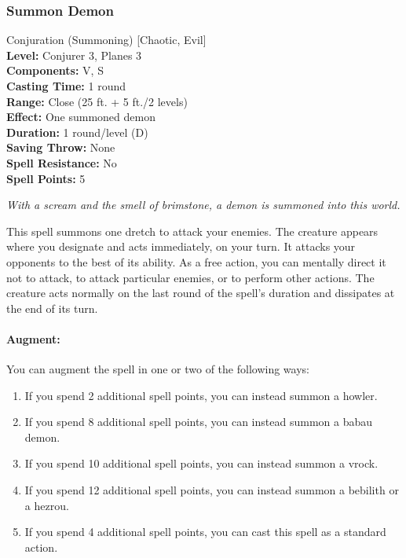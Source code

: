 \subsubsection{Summon Demon}
\label{Spell:SummonDemon}
Conjuration (Summoning) [Chaotic, Evil]
\\ \textbf{Level:} Conjurer 3, Planes 3
\\ \textbf{Components:} V, S
\\ \textbf{Casting Time:} 1 round
\\ \textbf{Range:} Close (25 ft. + 5 ft./2 levels)
\\ \textbf{Effect:} One summoned demon
\\ \textbf{Duration:} 1 round/level (D)
\\ \textbf{Saving Throw:} None
\\ \textbf{Spell Resistance:} No
\\ \textbf{Spell Points:} 5

\emph{With a scream and the smell of brimstone, a demon is summoned into this world.}

This spell summons one dretch to attack your enemies.
The creature appears where you designate and acts immediately, on your turn. 
It attacks your opponents to the best of its ability. 
As a free action, you can mentally direct it not to attack, to attack particular enemies, or to perform other actions. 
The creature acts normally on the last round of the spell's duration and dissipates at the end of its turn.

\paragraph{Augment:} You can augment the spell in one or two of the following ways: 
\begin{enumerate}
 \item If you spend 2 additional spell points, you can instead summon a howler.
 \item If you spend 8 additional spell points, you can instead summon a babau demon.
 \item If you spend 10 additional spell points, you can instead summon a vrock.
 \item If you spend 12 additional spell points, you can instead summon a bebilith or a hezrou. 
 \item If you spend 4 additional spell points, you can cast this spell as a standard action.
\end{enumerate}
